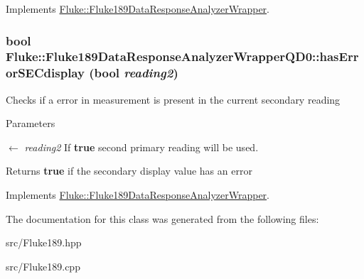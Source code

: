 Implements \hyperlink{classFluke_1_1Fluke189DataResponseAnalyzerWrapper_a831296ad9286753efede158c207adc19}{Fluke::Fluke189DataResponseAnalyzerWrapper}.\hypertarget{classFluke_1_1Fluke189DataResponseAnalyzerWrapperQD0_a97829a1943b858fd09c4fef1d6d61420}{
\subsubsection[{hasErrorSECdisplay}]{\setlength{\rightskip}{0pt plus 5cm}bool Fluke::Fluke189DataResponseAnalyzerWrapperQD0::hasErrorSECdisplay (bool {\em reading2})}}
\label{classFluke_1_1Fluke189DataResponseAnalyzerWrapperQD0_a97829a1943b858fd09c4fef1d6d61420}
Checks if a error in measurement is present in the current secondary reading 
\begin{DoxyParams}{Parameters}
\item[\mbox{$\leftarrow$} {\em reading2}]If {\bfseries true} second primary reading will be used. \end{DoxyParams}
\begin{DoxyReturn}{Returns}
{\bfseries true} if the secondary display value has an error 
\end{DoxyReturn}


Implements \hyperlink{classFluke_1_1Fluke189DataResponseAnalyzerWrapper_aa78f02012a5f1803c080bae3e6121286}{Fluke::Fluke189DataResponseAnalyzerWrapper}.

The documentation for this class was generated from the following files:\begin{DoxyCompactItemize}
\item 
src/Fluke189.hpp\item 
src/Fluke189.cpp\end{DoxyCompactItemize}
